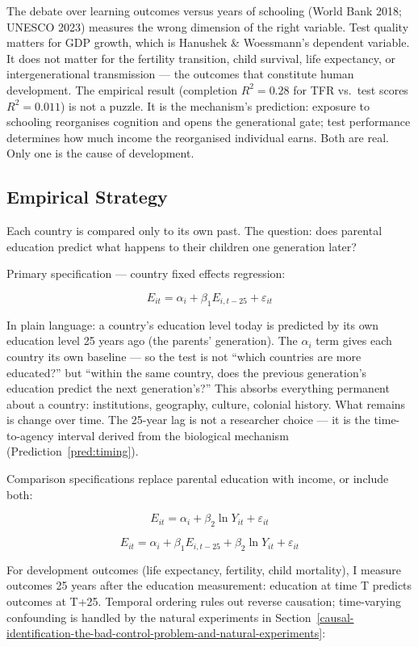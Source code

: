 \documentclass[12pt,letterpaper]{article}
\begin{document}
The debate over learning outcomes versus years of schooling (World Bank 2018;
UNESCO 2023) measures the wrong dimension of the right variable. Test
quality matters for GDP growth, which is Hanushek \& Woessmann's dependent
variable. It does not matter for the fertility transition, child survival,
life expectancy, or intergenerational transmission --- the outcomes that
constitute human development. The empirical result (completion $R^2 = 0.28$
for TFR vs.\ test scores $R^2 = 0.011$) is not a puzzle. It is the mechanism's
prediction: exposure to schooling reorganises cognition and opens the
generational gate; test performance determines how much income the reorganised
individual earns. Both are real. Only one is the cause of development.

\subsection{Empirical Strategy}\label{empirical-strategy}

Each country is compared only to its own past. The question: does parental education predict what happens to their children one generation later?

Primary specification --- country fixed effects regression:

\[E_{it} = \alpha_i + \beta_1 E_{i,t-25} + \varepsilon_{it}\]

In plain language: a country's education level today is predicted by its own education level 25 years ago (the parents' generation). The $\alpha_i$ term gives each country its own baseline --- so the test is not ``which countries are more educated?'' but ``within the same country, does the previous generation's education predict the next generation's?'' This absorbs everything permanent about a country: institutions, geography, culture, colonial history. What remains is change over time. The 25-year lag is not a researcher choice --- it is the time-to-agency interval derived from the biological mechanism (Prediction~\ref{pred:timing}).

Comparison specifications replace parental education with income, or include both:

\[E_{it} = \alpha_i + \beta_2 \ln Y_{it} + \varepsilon_{it}\]

\[E_{it} = \alpha_i + \beta_1 E_{i,t-25} + \beta_2 \ln Y_{it} + \varepsilon_{it}\]

For development outcomes (life expectancy, fertility, child mortality), I measure outcomes 25 years after the education measurement: education at time T predicts outcomes at T+25. Temporal ordering rules out reverse causation; time-varying confounding is handled by the natural experiments in Section~\ref{causal-identification-the-bad-control-problem-and-natural-experiments}:
\end{document}
